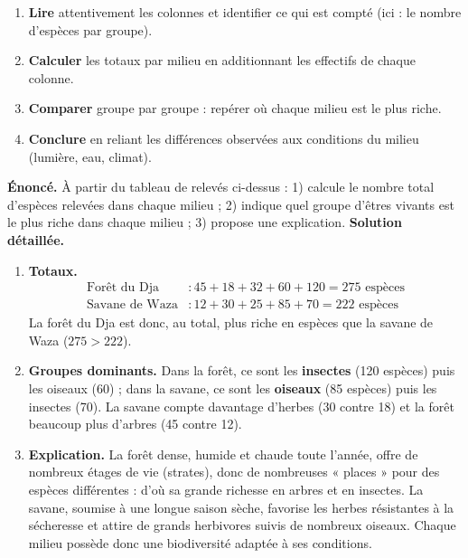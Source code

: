 \documentclass[11pt]{article}
\begin{document}
\begin{methode}
\begin{enumerate}
\item \textbf{Lire} attentivement les colonnes et identifier ce qui est compté (ici : le nombre d'espèces par groupe).
\item \textbf{Calculer} les totaux par milieu en additionnant les effectifs de chaque colonne.
\item \textbf{Comparer} groupe par groupe : repérer où chaque milieu est le plus riche.
\item \textbf{Conclure} en reliant les différences observées aux conditions du milieu (lumière, eau, climat).
\end{enumerate}
\end{methode}

\begin{exoresolu}
\textbf{Énoncé.} À partir du tableau de relevés ci-dessus : 1) calcule le nombre total d'espèces relevées dans chaque milieu ; 2) indique quel groupe d'êtres vivants est le plus riche dans chaque milieu ; 3) propose une explication.
\tcblower
\textbf{Solution détaillée.}
\begin{enumerate}
\item \textbf{Totaux.}
\begin{align*}
\text{Forêt du Dja} &: 45 + 18 + 32 + 60 + 120 = 275 \text{ espèces}\\
\text{Savane de Waza} &: 12 + 30 + 25 + 85 + 70 = 222 \text{ espèces}
\end{align*}
La forêt du Dja est donc, au total, plus riche en espèces que la savane de Waza ($275 > 222$).
\item \textbf{Groupes dominants.} Dans la forêt, ce sont les \textbf{insectes} (120 espèces) puis les oiseaux (60) ; dans la savane, ce sont les \textbf{oiseaux} (85 espèces) puis les insectes (70). La savane compte davantage d'herbes (30 contre 18) et la forêt beaucoup plus d'arbres (45 contre 12).
\item \textbf{Explication.} La forêt dense, humide et chaude toute l'année, offre de nombreux étages de vie (strates), donc de nombreuses « places » pour des espèces différentes : d'où sa grande richesse en arbres et en insectes. La savane, soumise à une longue saison sèche, favorise les herbes résistantes à la sécheresse et attire de grands herbivores suivis de nombreux oiseaux. Chaque milieu possède donc une biodiversité adaptée à ses conditions.
\end{enumerate}
\end{exoresolu}
\end{document}
